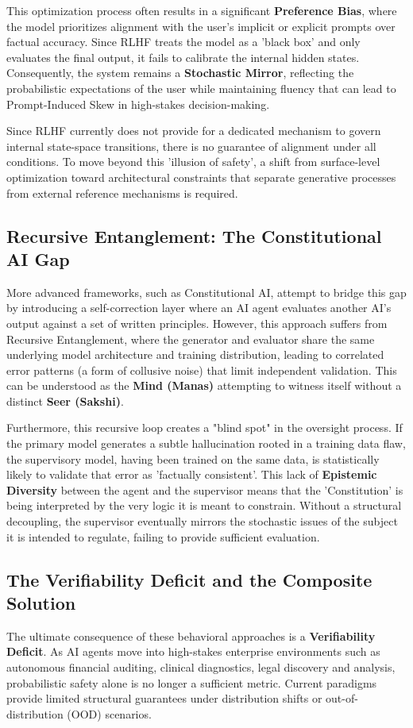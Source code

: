 \documentclass[12pt,a4paper]{article}
\begin{document}
This optimization process often results in a significant \textbf{Preference Bias}, where the model prioritizes alignment with the user's implicit or explicit prompts over factual accuracy. Since RLHF treats the model as a 'black box' and only evaluates the final output, it fails to calibrate the internal hidden states. Consequently, the system remains a \textbf{Stochastic Mirror}, reflecting the probabilistic expectations of the user while maintaining fluency that can lead to Prompt-Induced Skew in high-stakes decision-making.

Since RLHF currently does not provide for a dedicated mechanism to govern internal state-space transitions, there is no guarantee of alignment under all conditions. To move beyond this 'illusion of safety', a shift from surface-level optimization toward architectural constraints that separate generative processes from external reference mechanisms is required.

\subsection{Recursive Entanglement: The Constitutional AI Gap}
More advanced frameworks, such as Constitutional AI, attempt to bridge this gap by introducing a self-correction layer where an AI agent evaluates another AI’s output against a set of written principles. However, this approach suffers from Recursive Entanglement, where the generator and evaluator share the same underlying model architecture and training distribution, leading to correlated error patterns (a form of collusive noise) that limit independent validation. This can be understood as the \textbf{Mind (Manas)} attempting to witness itself without a distinct \textbf{Seer (Sakshi)}.

Furthermore, this recursive loop creates a "blind spot" in the oversight process. If the primary model generates a subtle hallucination rooted in a training data flaw, the supervisory model, having been trained on the same data, is statistically likely to validate that error as 'factually consistent'. This lack of \textbf{Epistemic Diversity} between the agent and the supervisor means that the 'Constitution' is being interpreted by the very logic it is meant to constrain. Without a structural decoupling, the supervisor eventually mirrors the stochastic issues of the subject it is intended to regulate, failing to provide sufficient evaluation.

\subsection{The Verifiability Deficit and the Composite Solution}
The ultimate consequence of these behavioral approaches is a \textbf{Verifiability Deficit}. As AI agents move into high-stakes enterprise environments such as autonomous financial auditing, clinical diagnostics, legal discovery and analysis, probabilistic safety alone is no longer a sufficient metric. Current paradigms provide limited structural guarantees under distribution shifts or out-of-distribution (OOD) scenarios.
\end{document}
